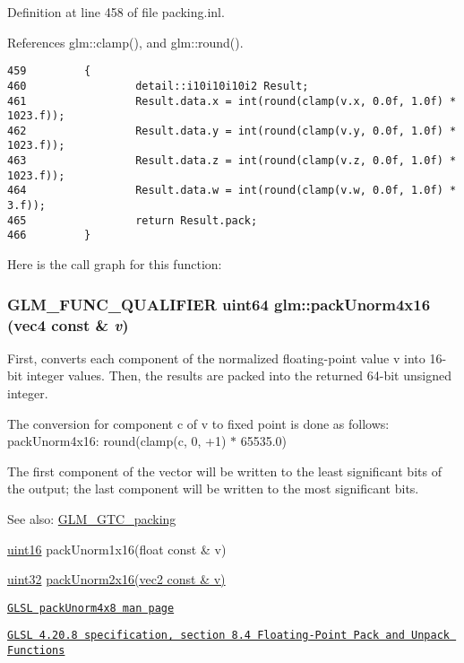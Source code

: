 Definition at line 458 of file packing.inl.

References glm::clamp(), and glm::round().

\begin{Code}\begin{verbatim}459         {
460                 detail::i10i10i10i2 Result;
461                 Result.data.x = int(round(clamp(v.x, 0.0f, 1.0f) * 1023.f));
462                 Result.data.y = int(round(clamp(v.y, 0.0f, 1.0f) * 1023.f));
463                 Result.data.z = int(round(clamp(v.z, 0.0f, 1.0f) * 1023.f));
464                 Result.data.w = int(round(clamp(v.w, 0.0f, 1.0f) *    3.f));
465                 return Result.pack;
466         }
\end{verbatim}
\end{Code}




Here is the call graph for this function:\hypertarget{group__gtc__packing_gc561f06c908b7302537a8ef29fcb409e}{
\subsubsection[packUnorm4x16]{\setlength{\rightskip}{0pt plus 5cm}GLM\_\-FUNC\_\-QUALIFIER uint64 glm::packUnorm4x16 (vec4 const \& {\em v})}}
\label{group__gtc__packing_gc561f06c908b7302537a8ef29fcb409e}


First, converts each component of the normalized floating-point value v into 16-bit integer values. Then, the results are packed into the returned 64-bit unsigned integer.

The conversion for component c of v to fixed point is done as follows: packUnorm4x16: round(clamp(c, 0, +1) $\ast$ 65535.0)

The first component of the vector will be written to the least significant bits of the output; the last component will be written to the most significant bits.

\begin{Desc}
\item[See also:]\hyperlink{group__gtc__packing}{GLM\_\-GTC\_\-packing} 

\hyperlink{group__gtc__type__precision_gd8c2939e1fdd8e5828b31d95c52255d5}{uint16} packUnorm1x16(float const \& v) 

\hyperlink{group__gtc__type__precision_g202b6a53c105fcb7e531f9b443518451}{uint32} \hyperlink{group__core__func__packing_g0659ddaf09727551c7bf51655d2a65cf}{packUnorm2x16(vec2 const \& v)} 

\href{http://www.opengl.org/sdk/docs/manglsl/xhtml/packUnorm4x8.xml}{\tt GLSL packUnorm4x8 man page} 

\href{http://www.opengl.org/registry/doc/GLSLangSpec.4.20.8.pdf}{\tt GLSL 4.20.8 specification, section 8.4 Floating-Point Pack and Unpack Functions} \end{Desc}


